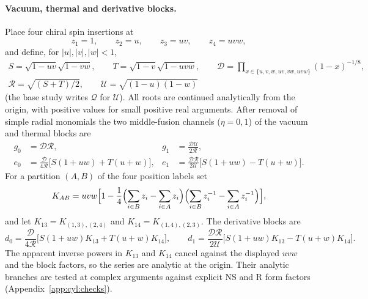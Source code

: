 \documentclass[11pt,a4paper]{article}
\numberwithin{equation}{section}
\begin{document}
\paragraph{Vacuum, thermal and derivative blocks.} Place four chiral spin insertions at
\begin{equation}
 z_1=1,\qquad z_2=u,\qquad z_3=uv,\qquad z_4=uvw,
\end{equation}
and define, for $|u|,|v|,|w|<1$,
\begin{equation}
\begin{gathered}
 S=\sqrt{1-uv}\sqrt{1-vw},\qquad T=\sqrt{1-v}\sqrt{1-uvw},\qquad
 \mathcal D=\prod_{x\in\{u,v,w,uv,vw,uvw\}}(1-x)^{-1/8},\\
 \mathcal R=\sqrt{(S+T)/2},\qquad \mathcal U=\sqrt{(1-u)(1-w)}
\end{gathered}
\end{equation}
(the base study writes $\mathcal Q$ for $\mathcal U$). All roots are continued analytically from the origin, with
positive values for small positive real arguments. After removal of simple radial monomials the two middle-fusion
channels ($\eta=0,1$) of the vacuum and thermal blocks are
\begin{equation}
\begin{aligned}
 g_0&=\mathcal D\mathcal R, & g_1&=\frac{\mathcal D\mathcal U}{2\mathcal R},\\
 e_0&=\frac{\mathcal D}{4\mathcal R}\bigl[S(1+uw)+T(u+w)\bigr], &
 e_1&=\frac{\mathcal D\mathcal R}{2\mathcal U}\bigl[S(1+uw)-T(u+w)\bigr].
\end{aligned}
\label{eq:cyl:blocksge}
\end{equation}
For a partition $(A,B)$ of the four position labels set
\begin{equation}
 K_{AB}=uvw\Bigl[1-\frac14\Bigl(\sum_{i\in B}z_i-\sum_{i\in A}z_i\Bigr)\Bigl(\sum_{i\in B}z_i^{-1}-\sum_{i\in A}z_i^{-1}\Bigr)\Bigr],
\end{equation}
and let $K_{13}=K_{(1,3),(2,4)}$ and $K_{14}=K_{(1,4),(2,3)}$. The derivative blocks are
\begin{equation}
 d_0=\frac{\mathcal D}{4\mathcal R}\bigl[S(1+uw)K_{13}+T(u+w)K_{14}\bigr],\qquad
 d_1=\frac{\mathcal D\mathcal R}{2\mathcal U}\bigl[S(1+uw)K_{13}-T(u+w)K_{14}\bigr].
 \label{eq:cyl:blocksd}
\end{equation}
The apparent inverse powers in $K_{13}$ and $K_{14}$ cancel against the displayed $uvw$ and the block factors, so the
series are analytic at the origin. Their analytic branches are tested at complex arguments against explicit NS and R
form factors (Appendix~\ref{app:cyl:checks}).
\end{document}
